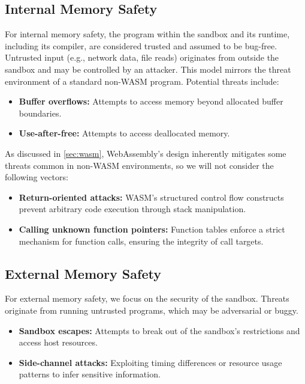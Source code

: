 \subsection{Internal Memory Safety}
\label{subsec:internal-memory-safety}
For internal memory safety, the program within the sandbox and its runtime, including its compiler, are considered trusted and assumed to be bug-free.
Untrusted input (e.g., network data, file reads) originates from outside the sandbox and may be controlled by an attacker.
This model mirrors the threat environment of a standard non-\ac{WASM} program.
Potential threats include:

\begin{itemize}
    \item \textbf{Buffer overflows:} Attempts to access memory beyond allocated buffer boundaries.
    \item \textbf{Use-after-free:} Attempts to access deallocated memory.
\end{itemize}

\noindent
As discussed in \cref{sec:wasm}, WebAssembly's design inherently mitigates some threats common in non-\ac{WASM} environments, so we will not consider the following vectors:

\begin{itemize}
    \item \textbf{Return-oriented attacks:} {\ac{WASM}'s} structured control flow constructs prevent arbitrary code execution through stack manipulation.
    \item \textbf{Calling unknown function pointers:} Function tables enforce a strict mechanism for function calls, ensuring the integrity of call targets.
\end{itemize}

\subsection{External Memory Safety}
\label{subsec:external-memory-safety}

For external memory safety, we focus on the security of the sandbox.
Threats originate from running untrusted programs, which may be adversarial or buggy.

\begin{itemize}
    \item \textbf{Sandbox escapes:} Attempts to break out of the sandbox's restrictions and access host resources.
    \item \textbf{Side-channel attacks:} Exploiting timing differences or resource usage patterns to infer sensitive information.
\end{itemize}

